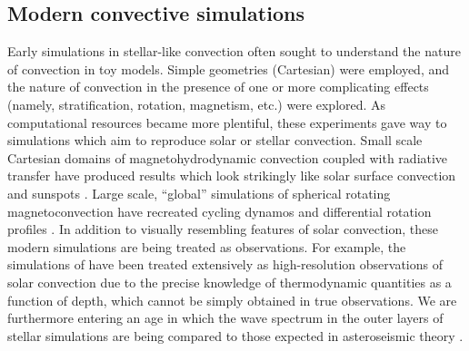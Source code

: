 \documentclass[aasms,11pt]{article}
\begin{document}
\subsection{Modern convective simulations}
\label{sct:modern_simulations}
Early simulations in stellar-like convection \citep{graham1975, hurlburt&all1984, cattaneo&all1991, brummell&all1996, brummell&all1998} often sought to understand the nature of convection in toy models.
Simple geometries (Cartesian) were employed, and the nature of convection in the presence of one or more complicating effects (namely, stratification, rotation, magnetism, etc.) were explored.
As computational resources became more plentiful, these experiments gave way to simulations which aim to reproduce solar or stellar convection.
Small scale Cartesian domains of magnetohydrodynamic convection coupled with radiative transfer have produced results which look strikingly like solar surface convection and sunspots \citep{stein&nordlund1998, rempel&all2009, stein&nordlund2012, rempel2014}.
Large scale, ``global'' simulations of spherical rotating magnetoconvection have recreated cycling dynamos and differential rotation profiles \citep{brown&all2010, brown&all2011, guerrero&all2016, brun&all2017, strugarek&all2018}.
In addition to visually resembling features of solar convection, these modern simulations are being treated as observations.
For example, the simulations of \citet{rempel2014} have been treated extensively as high-resolution observations of solar convection\citep[see e.g.,][and others]{vankooten&cranmer2017, shchukina&trujillo2019} due to the precise knowledge of thermodynamic quantities as a function of depth, which cannot be simply obtained in true observations.
We are furthermore entering an age in which the wave spectrum in the outer layers of stellar simulations are being compared to those expected in asteroseismic theory \citep{edelmann&all2019}.
\end{document}
